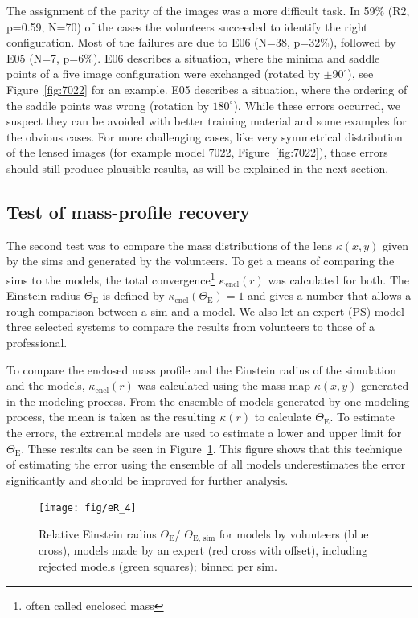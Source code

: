 \documentclass[12pt,preprint]{aastex}
\newcommand{\ERg}[1][]{$\Theta_{\text{E#1}}$\xspace} %
\newcommand{\ERf}[1][]{Einstein radius $\Theta_\text{E#1}$\xspace} %
\newcommand{\kenc}[1][r]{$\kappa_\text{encl}(#1)$\xspace}
\newcommand{\kap}[1][r]{$\kappa(#1)$\xspace}
\newcommand{\figref}[1]{Figure~\ref{fig:#1}}
\newcommand{\dgr}{^{\circ}}
\begin{document}
The assignment of the parity of the images was a more difficult task.
In 59\% (R2, p=0.59, N=70) of the cases the volunteers succeeded to identify the right configuration.
Most of the failures are due to E06 (N=38, p=32\%), followed by E05 (N=7, p=6\%).
E06 describes a situation, where the minima and saddle points of a five image configuration were exchanged (rotated by $\pm90\dgr$), see \figref{7022} for an example.
E05 describes a situation, where the ordering of the saddle points was wrong (rotation by $180\dgr$).
While these errors occurred, we suspect they can be avoided with better training material and some examples for the obvious cases.
For more challenging cases, like very symmetrical distribution of the lensed images (for example model 7022, \figref{7022}), those errors should still produce plausible results, as will be explained in the next section.



\subsection{Test of mass-profile recovery} \label{sec:tests.t2}

The second test was to compare the mass distributions of the lens $\kappa(x, y)$ given by the sims and generated by the volunteers.
To get a means of comparing the sims to the models, the total convergence\footnote{often called enclosed mass} $\kappa_{\text{encl}}(r)$ was calculated for both.
The Einstein radius $\Theta_\text{E}$ is defined by $\kappa_{\text{encl}}(\Theta_\text{E})=1$ and gives a number that allows a rough comparison between a sim and a model.
We also let an expert (PS) model three selected systems to compare the results from volunteers to those of a professional.


To compare the enclosed mass profile and the Einstein radius of the simulation and the models, \kenc was calculated using the mass map \kap[x,y] generated in the modeling process.
From the ensemble of models generated by one modeling process, the mean is taken as the resulting $\kappa(r)$ to calculate \ERg.
To estimate the errors, the extremal models are used to estimate a lower and upper limit for \ERg.
These results can be seen in \figref{ER_per_sim}.
This figure shows that this technique of estimating the error using the ensemble of all models underestimates the error significantly and should be improved for further analysis.

\begin{figure}[htbp]
  \centering
    \texttt{[image: fig/eR\_4]}
  \caption{Relative \ERf / \ERg[, sim] for models by volunteers (blue cross), models made by an expert (red cross with offset), including rejected models (green squares); binned per sim.}
  \label{fig:ER_per_sim}
\end{figure}
\end{document}
